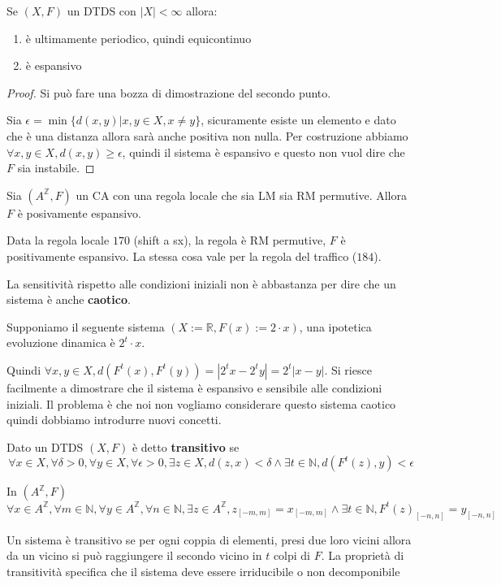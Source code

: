 \begin{nota}
    Se $(X,F)$ un DTDS con $|X|<\infty$ allora:
    \begin{enumerate}
        \item è ultimamente periodico, quindi equicontinuo
        \item è espansivo
    \end{enumerate}
    \begin{proof}
        Si può fare una bozza di dimostrazione del secondo punto.

        Sia $\epsilon = \min\{d(x,y)|x,y\in X, x\ne y\}$, sicuramente esiste un 
        elemento e dato che è una distanza allora sarà anche positiva non nulla.
        Per costruzione abbiamo $\forall x,y\in X, d(x,y)\ge \epsilon$, quindi il 
        sistema è espansivo e questo non vuol dire che $F$ sia instabile.
    \end{proof}
\end{nota}

\begin{teorema}
    Sia $(A^\mathbb{Z}, F)$ un CA con una regola locale  che sia LM sia RM permutive.
    Allora $F$ è posivamente espansivo.    
\end{teorema}

\begin{esempio}
    Data la regola locale $170$ (shift a sx), la regola è RM permutive, $F$ è positivamente espansivo.
    La stessa cosa vale per la regola del traffico ($184$).
\end{esempio}

La sensitività rispetto alle condizioni iniziali non è abbastanza per dire che un
sistema è anche \textbf{caotico}.

\begin{esempio}
    Supponiamo il seguente sistema $(X:=\mathbb{R},F(x):= 2\cdot x)$, una ipotetica
    evoluzione dinamica è $2^t\cdot x$.

    Quindi $\forall x,y\in X, d(F^t(x),F^t(y)) = |2^tx-2^ty|= 2^t|x-y|$. Si riesce 
    facilmente a dimostrare che il sistema è espansivo e sensibile alle condizioni 
    iniziali. Il problema è che noi non vogliamo considerare questo sistema caotico 
    quindi dobbiamo introdurre nuovi concetti.
\end{esempio}

\begin{definizione}
    Dato un DTDS $(X,F)$ è detto \textbf{transitivo} se 
    $$\forall x\in X,\forall \delta >0, \forall y\in X,\forall \epsilon>0, \exists 
    z\in X, d(z,x)< \delta \land \exists t\in \mathbb{N},d(F^t(z),y)<\epsilon$$

    In $(A^\mathbb{Z},F)$
    $$\forall x\in A^\mathbb{Z},\forall m \in\mathbb{N}, \forall y\in A^\mathbb{Z},\forall n\in\mathbb{N}, \exists 
    z\in A^\mathbb{Z}, z_{[-m,m]} = x_{[-m,m]} \land \exists t\in \mathbb{N},F^t(z)_{[-n,n]} = y_{[-n,n]}$$

\end{definizione}
Un sistema è transitivo se per ogni coppia di elementi, presi due loro vicini allora 
da un vicino si può raggiungere il secondo vicino in $t$ colpi di $F$. La proprietà 
di transitività specifica che il sistema deve essere irriducibile o non decomponibile

